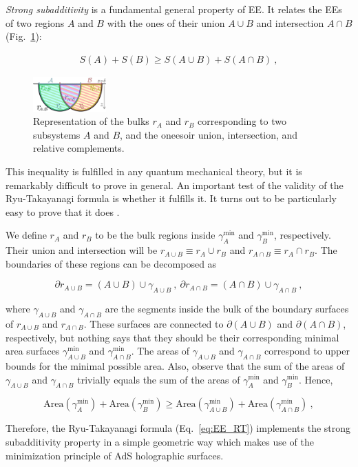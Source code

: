 \documentclass[twocolumn]{revtex4-2}
\providecommand{\eq}[2]{
    \begin{equation}
        #2
    \label{eq:#1}
    \end{equation}
}
\providecommand{\eqgat}[2]{
    \begin{gather}
        #2
    \label{eq:#1}
    \end{gather}
}
\begin{document}
\emph{Strong subadditivity}  is a fundamental general property of EE. It relates the EEs of two regions $A$ and $B$ with the ones of their union $A \cup B$ and intersection $A \cap B$ %
(Fig.~\ref{fig:SS}):
\eqgat{EE_strong-subadd}{
    S(A) + S(B) \ge S(A \cup B) + S(A \cap B) \ , %
}
\begin{figure}
    \centering
    \includegraphics[width=0.25\textwidth]{../imatges/SS_D.png}
\caption{Representation of the bulks $r_A$ and $r_B$ corresponding to two subsystems $A$ and $B$, and the oneesoir union, intersection, and relative complements.}
\label{fig:SS}
\end{figure}
This inequality is fulfilled in any quantum mechanical theory, but it is remarkably difficult to prove in general. An important test of the validity of the Ryu-Takayanagi formula is whether it fulfills it. It turns out to be particularly easy to prove that it does \cite{headrick_holographic_2007}.

We define $r_A$ and $r_B$ to be the bulk regions inside $\gamma^{\text{min}}_A$ and $\gamma^{\text{min}}_B$, respectively. Their union and intersection will be $r_{A \cup B} \equiv  r_A \cup r_B$ and $r_{A \cap B} \equiv  r_A \cap r_B$. The boundaries of these regions can be decomposed as
\eq{SS_dr-1}{
    \partial r_{A \cup B} = (A \cup B) \cup \gamma_{A \cup B} \ , \ \partial r_{A \cap B } = (A \cap B) \cup \gamma_{A \cap B} \ , \nonumber
}
where $\gamma_{A \cup B}$ and $\gamma_{A \cap B}$ are the segments inside the bulk of the boundary surfaces of $r_{A \cup B}$ and $r_{A \cap B}$. These surfaces are connected to $\partial (A \cup B)$ and $\partial (A \cap B)$, respectively, but nothing says that they should be their corresponding minimal area surfaces $\gamma^{\text{min}}_{A \cup B}$ and $\gamma^{\text{min}}_{A \cap B}$. The areas of $\gamma_{A \cup B}$ and $\gamma_{A \cap B}$ correspond to upper bounds for the minimal possible area. Also, observe that the sum of the areas of $\gamma_{A \cup B}$ and $\gamma_{A \cap B}$ trivially equals the sum of the areas of $\gamma^{\text{min}}_A$ and $\gamma^{\text{min}}_B$. Hence,
\eq{SS_gamma-1}{
    {\text{Area}}(\gamma^{\text{min}}_A) + {\text{Area}}(\gamma^{\text{min}}_B) %
    \ge   {\text{Area}}(\gamma^{\text{min}}_{A \cup B}) +   {\text{Area}}(\gamma^{\text{min}}_{A \cap B}) \ , \nonumber
}
Therefore, the Ryu-Takayanagi formula (Eq.~\ref{eq:EE_RT}) implements the strong subadditivity property in a simple geometric way which makes use of the minimization principle of AdS holographic surfaces. %
\end{document}
